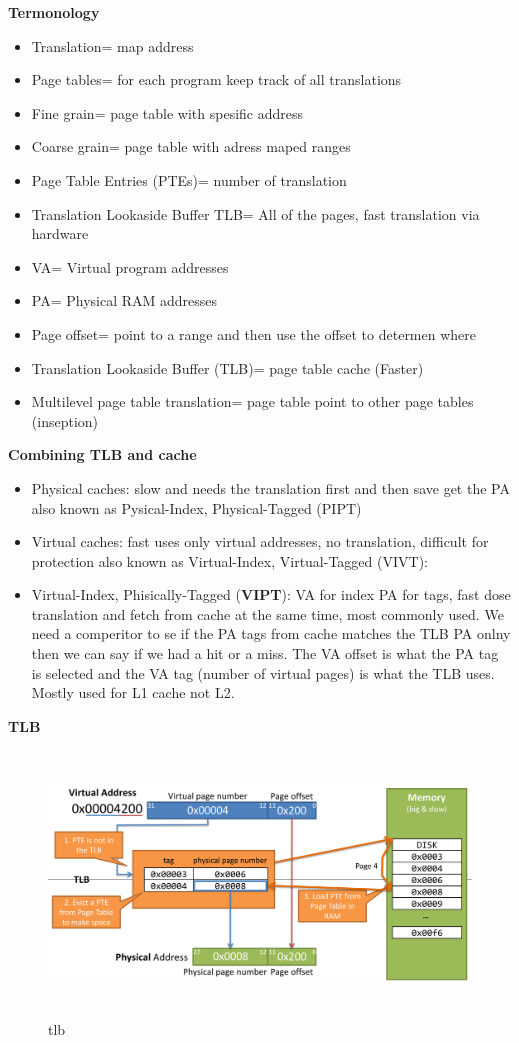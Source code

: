 \documentclass{article}
\begin{document}
\textbf{Termonology}
\begin{itemize}
\item  Translation= map address
\item  Page tables= for each program keep track of all translations
\item  Fine grain= page table with spesific address
\item  Coarse grain= page table with adress maped ranges
\item  Page Table Entries (PTEs)= number of translation  
\item  Translation Lookaside Buffer TLB= All of the pages, fast translation via hardware
\item  VA= Virtual program addresses
\item  PA= Physical RAM addresses
\item  Page offset= point to a range and then use the offset to determen where
\item  Translation Lookaside Buffer (TLB)= page table cache (Faster)
\item  Multilevel page table translation= page table point to other page tables (inseption)
\end{itemize}

\newpage

\textbf{Combining TLB and cache}
\begin{itemize}
\item  Physical caches: slow and needs the translation first and then save get the PA
  also known as Pysical-Index, Physical-Tagged (PIPT)
\item  Virtual caches: fast uses only virtual addresses, no translation, difficult for protection
  also known as Virtual-Index, Virtual-Tagged (VIVT):
\item  Virtual-Index, Phisically-Tagged (\textbf{VIPT}): VA for index PA for tags, fast dose translation and
  fetch from cache at the same time, most commonly used.
  We need a comperitor to se if the PA tags from cache matches the TLB PA onlny then we can say if we had a hit or a miss.
  The VA offset is what the PA tag is selected and the VA tag (number of virtual pages) is what the TLB uses.
  Mostly used for L1 cache not L2.
\end{itemize}

\textbf{TLB}
\begin{figure}[h]
    \vspace{10mm}
    \centering
    \includegraphics[width=16cm, height=7cm]{image/tlb.png}
    \caption{tlb}
\end{figure}
\end{document}
